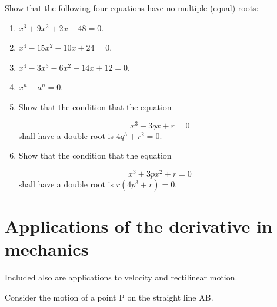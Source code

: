 
Show that the following four equations have no multiple (equal) roots:

\begin{enumerate}
\addtocounter{enumi}{10}

\item
$x^3 + 9x^2 + 2x - 48 = 0$.

\item
$x^4 - 15x^2 - 10x + 24 = 0$.

\item
$x^4 - 3x^3 - 6x^2 + 14x + 12 = 0$.

\item
$x^n - a^n = 0$.

\item
Show that the condition that the equation

\[
 x^3 + 3qx + r = 0
\]
shall have a double root is $4q^3 + r^2 = 0$.

\item
Show that the condition that the equation

\[
   x^3 + 3px^2 + r = 0
\]
shall have a double root is $r(4p^3 + r) = 0$.

\end{enumerate}


\section{Applications of the derivative in mechanics}

Included also are applications to velocity and rectilinear motion. 

Consider the motion of a point P on the straight line AB.


